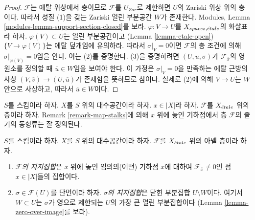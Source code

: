\begin{proof}
$\mathcal{F}$는 에탈 위상에서 층이므로
$\mathcal{F}$를 $U_{Zar}$로 제한하면
$U$의 Zariski 위상 위의 층이다. 따라서 성질 (1)을 갖는
Zariski 열린 부분공간 $W$가 존재한다. Modules, Lemma
\ref{modules-lemma-support-section-closed}를 보라.
$\varphi : V \to U$를 $X_{spaces, {\acute{e}tale}}$의 화살표라 하자.
$\varphi(V) \subset U$는 열린 부분공간이고
(Lemma \ref{lemma-etale-open})
$\{V \to \varphi(V)\}$는 에탈 덮개임에 유의하라.
따라서 $\sigma|_V = 0$이면 $\mathcal{F}$의 층 조건에 의해
$\sigma|_{\varphi(V)} = 0$임을 안다. 이는 (2)를 증명한다.
(3)을 증명하려면 $(U, \overline{u}, \sigma)$가
$\mathcal{F}_{\overline{x}}$의 영원소를 정의할 때
$\overline{u} \in W$임을 보여야 한다. 이 가정은
$\sigma|_V = 0$을 만족하는 에탈 근방의 사상
$(V, \overline{v}) \to (U, \overline{u})$가 존재함을 뜻하므로 참이다.
실제로 (2)에 의해 $V \to U$는 $W$ 안으로 사상하고,
따라서 $\overline{u} \in W$이다.
\end{proof}

\noindent
$S$를 스킴이라 하자.
$X$를 $S$ 위의 대수공간이라 하자.
$x \in |X|$라 하자.
$\mathcal{F}$를 $X_{\acute{e}tale}$ 위의 층이라 하자.
Remark \ref{remark-map-stalks}에 의해 $x$ 위에 놓인 기하점에서
층 $\mathcal{F}$의 줄기의 동형류는 잘 정의된다.

\begin{definition}
\label{definition-support}
$S$를 스킴이라 하자.
$X$를 $S$ 위의 대수공간이라 하자.
$\mathcal{F}$를 $X_{\acute{e}tale}$ 위의 아벨 층이라 하자.
\begin{enumerate}
\item {\it $\mathcal{F}$의 지지집합}은 $x$ 위에 놓인
임의의(어떤) 기하점 $\overline{x}$에 대하여
$\mathcal{F}_{\overline{x}} \not = 0$인 점 $x \in |X|$들의 집합이다.
\item $\sigma \in \mathcal{F}(U)$를 단면이라 하자.
{\it $\sigma$의 지지집합}은 닫힌 부분집합 $U \setminus W$이다.
여기서 $W \subset U$는 $\sigma$가 영으로 제한되는
$U$의 가장 큰 열린 부분집합이다
(Lemma \ref{lemma-zero-over-image}를 보라).
\end{enumerate}
\end{definition}


